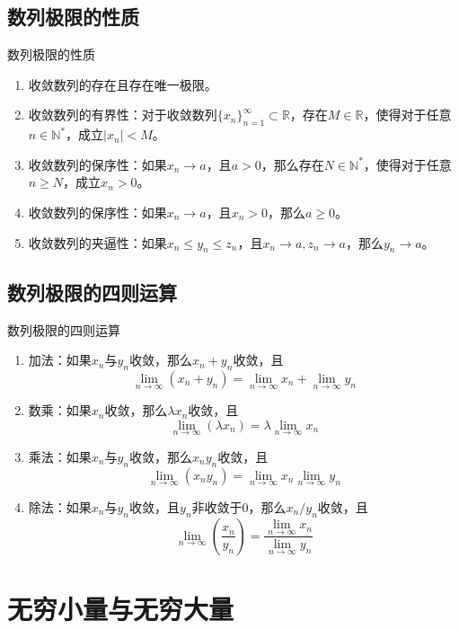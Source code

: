 \documentclass[lang = cn, scheme = chinese, thmcnt = section]{elegantbook}
\newcommand{\N}{\mathbb{N}}            %
\newcommand{\R}{\mathbb{R}}            %
\newcommand{\sub}{\subset}             %
\begin{document}
\subsection{数列极限的性质}

\begin{proposition}{数列极限的性质}
	\begin{enumerate}
		\item 收敛数列的存在且存在唯一极限。
		\item 收敛数列的有界性：对于收敛数列$\{x_n\}_{n=1}^{\infty}\sub\R$，存在$M\in\R$，使得对于任意$n\in\N^*$，成立$|x_n|<M$。
		\item 收敛数列的保序性：如果$x_n\to a$，且$a>0$，那么存在$N\in\N^*$，使得对于任意$n\ge N$，成立$x_n>0$。
		\item 收敛数列的保序性：如果$x_n\to a$，且$x_n>0$，那么$a\ge 0$。
		\item 收敛数列的夹逼性：如果$x_n\le y_n\le z_n$，且$x_n\to a,z_n\to a$，那么$y_n\to a$。
	\end{enumerate}
\end{proposition}

\subsection{数列极限的四则运算}

\begin{proposition}{数列极限的四则运算}
	\begin{enumerate}
		\item 加法：如果$x_n$与$y_n$收敛，那么$x_n+y_n$收敛，且
		$$
		\lim_{n\to\infty}(x_n+y_n)
		=\lim_{n\to\infty}x_n+\lim_{n\to\infty}y_n
		$$
		\item 数乘：如果$x_n$收敛，那么$\lambda x_n$收敛，且
		$$
		\lim_{n\to\infty}(\lambda x_n)
		=\lambda\lim_{n\to\infty}x_n
		$$
		\item 乘法：如果$x_n$与$y_n$收敛，那么$x_ny_n$收敛，且
		$$
		\lim_{n\to\infty}(x_ny_n)
		=\lim_{n\to\infty}x_n\lim_{n\to\infty}y_n
		$$
		\item 除法：如果$x_n$与$y_n$收敛，且$y_n$非收敛于$0$，那么$x_n/y_n$收敛，且
		$$
		\lim_{n\to\infty}\left(\frac{x_n}{y_n}\right)
		=\frac{\lim\limits_{n\to\infty}x_n}{\lim\limits_{n\to\infty}y_n}
		$$
	\end{enumerate}
\end{proposition}

\section{无穷小量与无穷大量}
\end{document}
